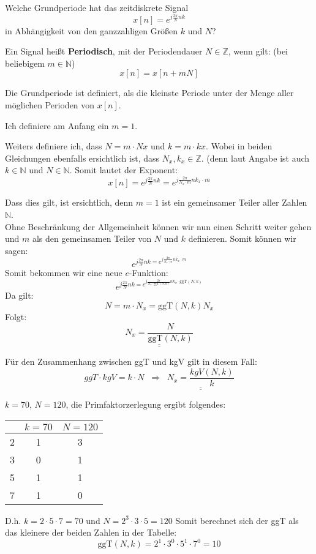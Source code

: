 \begin{uebsp}
\begin{Exercise}
    Welche Grundperiode hat das zeitdiskrete Signal
    \[x[n]=e^{j\frac{2\pi}{N}nk}\]
    in Abhängigkeit von den ganzzahligen Größen $k$ und $N$?
\end{Exercise}
\begin{Answer}
\begin{uebsp_theory}
    Ein Signal heißt \textbf{Periodisch}, mit der Periodendauer $N\in\mathbb{Z}$, wenn gilt: (bei beliebigem $m\in \mathbb{N}$)
    \[x[n]=x[n+mN]\]
\end{uebsp_theory}
\begin{uebsp_theory}
    Die Grundperiode ist definiert, als die kleinste Periode unter der Menge aller möglichen Perioden von $x[n]$.
\end{uebsp_theory}

Ich definiere am Anfang ein $m = 1$.

Weiters definiere ich, dass $N = m\cdot Nx$ und $k = m\cdot kx$. Wobei in beiden Gleichungen ebenfalls ersichtlich ist, dass $N_x, k_x \in \mathbb{Z}$. (denn laut Angabe ist auch $k\in\mathbb{N}$ und $N\in\mathbb{N}$.
Somit lautet der Exponent:
\[x[n]=e^{j\frac{2\pi}{N}nk}=e^{j\frac{2\pi}{N_x\cdot m}nk_x\cdot m}\]

Dass dies gilt, ist ersichtlich, denn $m=1$ ist ein gemeinsamer Teiler aller Zahlen $\mathbb N$.\\

Ohne Beschränkung der Allgemeinheit können wir nun einen Schritt weiter gehen und $m$ als den gemeinsamen Teiler von $N$ und $k$ definieren. Somit können wir sagen:
\[e^{j\frac{2\pi}{N}nk=e^{j\frac{2\pi}{N_x\cdot m}nk_x\cdot m}}\]
Somit bekommen wir eine neue $e$-Funktion:
\[e^{j\frac{2\pi}{N}nk=e^{j\frac{2\pi}{N_x\cdot \text{ggT}(N,k)}nk_x\cdot \text{ggT}(N,k)}}\]
Da gilt:
\[N=m\cdot N_x=\text{ggT}(N,k)N_x\]
Folgt:
\[\underline{\underline{N_x=\frac{N}{\text{ggT}(N,k)}}}\]

Für den Zusammenhang zwischen ggT und kgV gilt in diesem Fall:
\[ggT\cdot kgV=k\cdot N\;\;\Rightarrow\;\;\underline{\underline{N_x=\frac{kgV(N,k)}{k}}}\]
\begin{bsp}
$k=70$, $N=120$, die Primfaktorzerlegung ergibt folgendes:\\
\begin{center}
\begin{tabular}{c|c|c}
&$k=70$&$N=120$\\
\hline
2&{\color{red}1}&{\color{green}3}\\
3&{\color{red}0}&{\color{green}1}\\
5&{\color{red}1}&{\color{green}1}\\
7&{\color{green}1}&{\color{red}0}\\
\hline
\end{tabular}
\end{center}
D.h. $k=2\cdot5\cdot7=70$ und $N=2^3\cdot3\cdot5=120$
Somit berechnet sich der {\color{red}ggT} als das kleinere der beiden Zahlen in der Tabelle:
\[\text{ggT}(N,k)=2^1\cdot 3^0\cdot 5^1\cdot 7^0=10\]


\end{bsp}
\end{Answer}
\end{uebsp}
